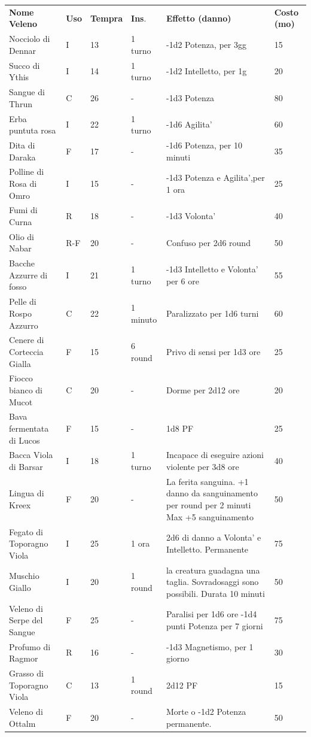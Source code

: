 \documentclass[a4paper,11pt,twoside,openany]{book}
\begin{document}
{		\begin{tabular}{L{3.7cm} k{1cm} k{1.5cm} k{1.3cm} k{5.5cm} k{1.5cm}}
			\toprule
			\textbf{Nome Veleno} & \textbf{Uso} & \textbf{Tempra} & \textbf{Ins}. & \textbf{Effetto (danno)} & \textbf{Costo (mo)}\tabularnewline
			Nocciolo di Dennar  & I & 13 & 1 turno & -1d2 Potenza, per 3gg & 15\tabularnewline
			Succo di Ythis & I & 14 & 1 turno & -1d2 Intelletto, per 1g & 20\tabularnewline
			Sangue di Thrun  & C & 26 & - & -1d3 Potenza & 80\tabularnewline
			Erba puntuta rosa  & I & 22 & 1 turno & -1d6 Agilita' & 60\tabularnewline
			Dita di Daraka & F & 17 & - & -1d6 Potenza, per 10 minuti & 35\tabularnewline
			Polline di Rosa di Omro & I & 15 & - & -1d3 Potenza e Agilita',per 1 ora & 25\tabularnewline
			Fumi di Curna& R & 18 & - & -1d3 Volonta' & 40\tabularnewline
			Olio di Nabar  & R-F & 20 & - & Confuso per 2d6 round & 50\tabularnewline
			Bacche Azzurre di fosso  & I & 21 & 1 turno & -1d3 Intelletto e Volonta' per 6 ore & 55\tabularnewline
			Pelle di Rospo Azzurro  & C & 22 & 1 minuto & Paralizzato per 1d6 turni & 60\tabularnewline
			Cenere di Corteccia Gialla  & F & 15 & 6 round & Privo di sensi per 1d3 ore & 25\tabularnewline
			Fiocco bianco di Mucot & C & 20 & - & Dorme per 2d12 ore & 20\tabularnewline
			Bava fermentata di Lucos  & F & 15 & - & 1d8 PF & 25\tabularnewline
			Bacca Viola di Barsar & I & 18 & 1 turno & Incapace di eseguire azioni violente per 3d8 ore & 40\\
			Lingua di Kreex  & F & 20 & - & La ferita sanguina. +1 danno da sanguinamento per round per 2 minuti Max +5 sanguinamento & 50 \\
			Fegato di Toporagno Viola & I & 25 & 1 ora & 2d6 di danno a Volonta' e Intelletto. Permanente & 75\\
			Muschio Giallo  & I & 20 & 1 round & la creatura guadagna una taglia. Sovradosaggi sono possibili. Durata 10 minuti & 50\tabularnewline
			Veleno di Serpe del Sangue  & F & 25 & - & Paralisi per 1d6 ore -1d4 punti Potenza per 7 giorni & 75\\
			Profumo di Ragmor & R & 16 & - & -1d3 Magnetismo, per 1 giorno & 30\tabularnewline
			Grasso di Toporagno Viola  & C & 13 & 1 round & 2d12 PF & 15\tabularnewline
			Veleno di Ottalm & F & 20 & - & Morte o -1d2 Potenza permanente. & 50\tabularnewline
		\end{tabular}
		
}
\end{document}
